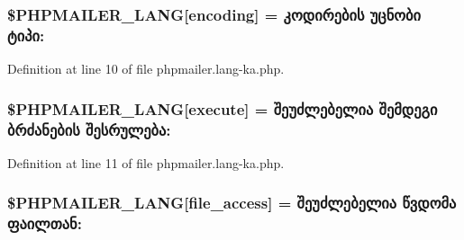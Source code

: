 \subsubsection[{\texorpdfstring{\$\+P\+H\+P\+M\+A\+I\+L\+E\+R\+\_\+\+L\+A\+NG}{$PHPMAILER_LANG}}]{\setlength{\rightskip}{0pt plus 5cm}\$P\+H\+P\+M\+A\+I\+L\+E\+R\+\_\+\+L\+A\+NG\mbox{[}\textquotesingle{}encoding\textquotesingle{}\mbox{]} = \textquotesingle{}კოდირების უცნობი ტიპი\+: \textquotesingle{}}\hypertarget{phpmailer_8lang-ka_8php_a817f7283f3d54c970a0c10305cc668cc}{}\label{phpmailer_8lang-ka_8php_a817f7283f3d54c970a0c10305cc668cc}


Definition at line 10 of file phpmailer.\+lang-\/ka.\+php.

\subsubsection[{\texorpdfstring{\$\+P\+H\+P\+M\+A\+I\+L\+E\+R\+\_\+\+L\+A\+NG}{$PHPMAILER_LANG}}]{\setlength{\rightskip}{0pt plus 5cm}\$P\+H\+P\+M\+A\+I\+L\+E\+R\+\_\+\+L\+A\+NG\mbox{[}\textquotesingle{}execute\textquotesingle{}\mbox{]} = \textquotesingle{}შეუძლებელია შემდეგი ბრძანების შესრულება\+: \textquotesingle{}}\hypertarget{phpmailer_8lang-ka_8php_a668217a9563a168f30f2a8548b6ed5a9}{}\label{phpmailer_8lang-ka_8php_a668217a9563a168f30f2a8548b6ed5a9}


Definition at line 11 of file phpmailer.\+lang-\/ka.\+php.

\subsubsection[{\texorpdfstring{\$\+P\+H\+P\+M\+A\+I\+L\+E\+R\+\_\+\+L\+A\+NG}{$PHPMAILER_LANG}}]{\setlength{\rightskip}{0pt plus 5cm}\$P\+H\+P\+M\+A\+I\+L\+E\+R\+\_\+\+L\+A\+NG\mbox{[}\textquotesingle{}file\+\_\+access\textquotesingle{}\mbox{]} = \textquotesingle{}შეუძლებელია წვდომა ფაილთან\+: \textquotesingle{}}\hypertarget{phpmailer_8lang-ka_8php_a7e83349023b856ef9e5c46e30ae6d51e}{}\label{phpmailer_8lang-ka_8php_a7e83349023b856ef9e5c46e30ae6d51e}


